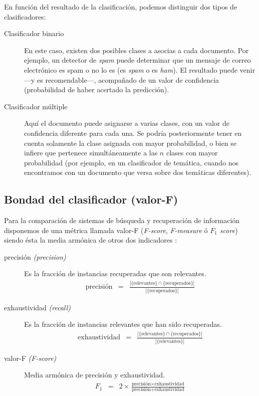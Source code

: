 En función del resultado de la clasificación, podemos distinguir dos tipos de clasificadores:
\nopagebreak
\begin{description}
\item[Clasificador binario] En este caso, existen dos posibles clases a asocias a cada documento. Por ejemplo, un detector de \emph{spam} puede determinar que un mensaje de correo electrónico es spam o no lo es (es \emph{spam} o es \emph{ham}). El resultado puede venir ---y es recomendable---, acompañado de un valor de confidencia (probabilidad de haber acertado la predicción).
\item[Clasificador múltiple] Aquí el documento puede asignarse a varias clases, con un valor de confidencia diferente para cada una. Se podría posteriormente tener en cuenta solamente la clase asignada con mayor probabilidad, o bien se infiere que pertenece simultáneamente a las $n$ clases con mayor probabilidad (por ejemplo, en un clasificador de temática, cuando nos encontramos con un documento que versa sobre dos temáticas diferentes).
\end{description}


\subsection{Bondad del clasificador (valor-F)}

Para la comparación de sistemas de búsqueda y recuperación de información disponemos de una métrica llamada valor-F (\emph{F-score}, \emph{F-measure} ó \emph{$F_1$ score}) siendo ésta la media armónica de otros dos indicadores \citep[Precisión y exhaustividad]{wikipedia-es}:
\begin{description}
\item[precisión \emph{(precision)}] 
Es la fracción de instancias recuperadas que son relevantes.
\begin{eqnarray}
\text{precisión} &=& \frac{|\{\text{relevantes}\}\cap\{\text{recuperados}\}|}{|\{\text{recuperados}\}|}
\end{eqnarray}
\item[exhaustividad \emph{(recall)}] 
Es la fracción de instancias relevantes que han sido recuperadas.
\begin{eqnarray}
\text{exhaustividad} &=& \frac{|\{\text{relevantes}\}\cap\{\text{recuperados}\}|}{|\{\text{relevantes}\}|}
\end{eqnarray}
\item[valor-F \emph{(F-score)}] Media armónica de precisión y exhaustividad.
\begin{eqnarray}
F_1 &=& 2\times\frac{\text{precisión}\times\text{exhaustividad}}{\text{precisión}+\text{exhaustividad}}
\end{eqnarray}
\end{description}

